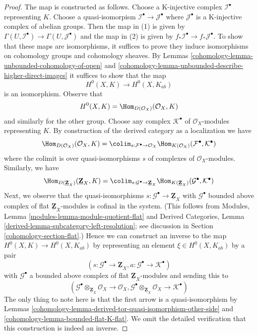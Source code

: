 \begin{proof}

The map is constructed as follows. Choose a K-injective complex
$\mathcal{I}^\bullet$ representing $K$. Choose a quasi-isomorpism
$\mathcal{I}^\bullet \to \mathcal{J}^\bullet$ where $\mathcal{J}^\bullet$
is a K-injective complex of abelian groups. Then the map in (1)
is given by $\Gamma(U, \mathcal{I}^\bullet) \to \Gamma(U, \mathcal{J}^\bullet)$
and the map in (2) is given by
$f_*\mathcal{I}^\bullet \to f_*\mathcal{J}^\bullet$.
To show that these maps are isomorphisms, it suffices to prove
they induce isomorphisms on cohomology groups and cohomology sheaves.
By Lemmas \ref{cohomology-lemma-unbounded-cohomology-of-open} and
\ref{cohomology-lemma-unbounded-describe-higher-direct-images}
it suffices to show that the map
$$
H^0(X, K) \longrightarrow H^0(X, K_{ab})
$$
is an isomorphism. Observe that
$$
H^0(X, K) = \Hom_{D(\mathcal{O}_X)}(\mathcal{O}_X, K)
$$
and similarly for the other group. Choose any complex $\mathcal{K}^\bullet$
of $\mathcal{O}_X$-modules representing $K$. By construction of the
derived category as a localization we have
$$
\Hom_{D(\mathcal{O}_X)}(\mathcal{O}_X, K) =
\colim_{s : \mathcal{F}^\bullet \to \mathcal{O}_X}
\Hom_{K(\mathcal{O}_X)}(\mathcal{F}^\bullet, \mathcal{K}^\bullet)
$$
where the colimit is over quasi-isomorphisms $s$ of complexes of
$\mathcal{O}_X$-modules. Similarly, we have
$$
\Hom_{D(\underline{\mathbf{Z}}_X)}(\underline{\mathbf{Z}}_X, K) =
\colim_{s : \mathcal{G}^\bullet \to \underline{\mathbf{Z}}_X}
\Hom_{K(\underline{\mathbf{Z}}_X)}(\mathcal{G}^\bullet, \mathcal{K}^\bullet)
$$
Next, we observe that the quasi-isomorphisms
$s : \mathcal{G}^\bullet \to \underline{\mathbf{Z}}_X$
with $\mathcal{G}^\bullet$ bounded above complex of flat
$\underline{\mathbf{Z}}_X$-modules is cofinal in the system.
(This follows from Modules, Lemma \ref{modules-lemma-module-quotient-flat} and
Derived Categories, Lemma \ref{derived-lemma-subcategory-left-resolution};
see discussion in Section \ref{cohomology-section-flat}.)
Hence we can construct an inverse to the map
$H^0(X, K) \longrightarrow H^0(X, K_{ab})$
by representing an element $\xi \in H^0(X, K_{ab})$ by a pair
$$
(s : \mathcal{G}^\bullet \to \underline{\mathbf{Z}}_X,
a : \mathcal{G}^\bullet \to \mathcal{K}^\bullet)
$$
with $\mathcal{G}^\bullet$ a bounded above complex of flat
$\underline{\mathbf{Z}}_X$-modules and sending this to
$$
(\mathcal{G}^\bullet \otimes_{\underline{\mathbf{Z}}_X} \mathcal{O}_X
\to \mathcal{O}_X,
\mathcal{G}^\bullet  \otimes_{\underline{\mathbf{Z}}_X} \mathcal{O}_X
\to \mathcal{K}^\bullet)
$$
The only thing to note here is that the first arrow
is a quasi-isomorphism by
Lemmas \ref{cohomology-lemma-derived-tor-quasi-isomorphism-other-side} and
\ref{cohomology-lemma-bounded-flat-K-flat}.
We omit the detailed verification that this construction
is indeed an inverse.
\end{proof}

